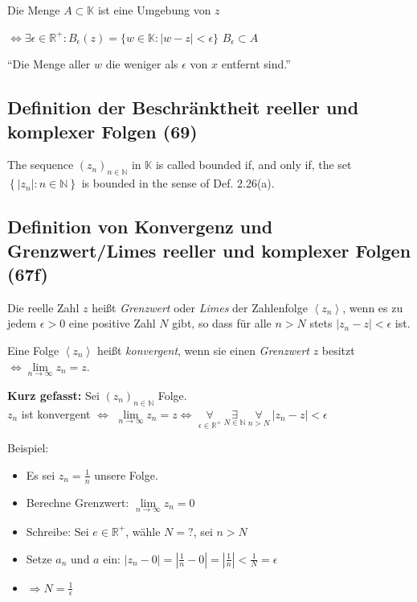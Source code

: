 \begin{leftbar}
Die Menge $A \subset \mathbb{K}$ ist eine Umgebung von $z$

$\Leftrightarrow \exists \epsilon \in \mathbb { R } ^ { + } : B_{\epsilon}(z) = \{w \in \mathbb{K} : |w-z| < \epsilon\}$
$B_{\epsilon} \subset A$

“Die Menge aller $w$ die weniger als $\epsilon$ von $x$ entfernt sind.”
\end{leftbar}

\subsection{Definition der Beschränktheit reeller und komplexer Folgen (69)}
The sequence $(z _ { n }) _ { n \in \mathbb { N } }$  in $\mathbb{K}$ is called bounded if, and only if, the set
$\left\{ | z _ { n } | : n \in \mathbb { N } \right\}$ is bounded in the sense of Def. 2.26(a).

\subsection{Definition von Konvergenz und Grenzwert/Limes reeller und komplexer Folgen (67f)}

Die reelle Zahl $z$ heißt \textit{Grenzwert} oder \textit{Limes} der Zahlenfolge $\left\langle z _ { n } \right\rangle$, wenn es zu jedem $\epsilon > 0$ eine positive Zahl $N$
 gibt, so dass für alle $n > N$ stets $| z _ { n } - z | < \epsilon$ ist.
 
 Eine Folge $\left\langle z _ { n } \right\rangle$ heißt \textit{konvergent}, wenn sie einen \textit{Grenzwert} $z$ besitzt $\Leftrightarrow \lim\limits_ { n \rightarrow \infty } z _ { n } = z$.
 
\textbf{Kurz gefasst:} Sei $(z_n)_{n \in \mathbb{N}}$ Folge.\\
$z_n$ ist konvergent $\Leftrightarrow$ 
$\lim\limits_{n \rightarrow \infty}{z_n} = z \Leftrightarrow$ 
$\underset{\epsilon \in \mathbb{R^+}}{\forall} \ \underset{N \in \mathbb{N}}{\exists} \ \underset{n > N}{\forall} \  |z_n - z| < \epsilon$
\newline
\begin{leftbar}
 Beispiel:
\begin{itemize}
 \item Es sei $z_n = \frac{1}{n}$ unsere Folge.
 \item Berechne Grenzwert: $\lim\limits_{n \rightarrow \infty}{z_n} = 0$
 \item Schreibe: Sei $e \in \mathbb{R^+}$, wähle $N = ?$, sei $n > N$
 \item Setze $a_n$ und $a$ ein: $|z_n - 0| = |\frac{1}{n} -0| = {|\frac{1}{n}| < \frac{1}{N}} = \epsilon$
 \item $\Rightarrow N = \frac{1}{\epsilon}$
 \end{itemize} 
 \end{leftbar}
 
